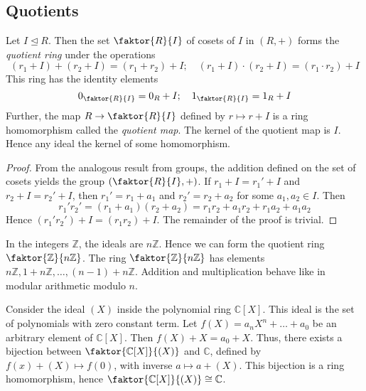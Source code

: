 \subsection{Quotients}
\begin{theorem}
	Let \( I \trianglelefteq R \).
	Then the set \( \faktor{R}{I} \) of cosets of \( I \) in \( (R, +) \) forms the \textit{quotient ring} under the operations
	\[ (r_1 + I) + (r_2 + I) = (r_1 + r_2) + I;\quad (r_1 + I) \cdot (r_2 + I) = (r_1 \cdot r_2) + I \]
	This ring has the identity elements
	\[ 0_{\faktor{R}{I}} = 0_R + I;\quad 1_{\faktor{R}{I}} = 1_R + I \]
	Further, the map \( R \to \faktor{R}{I} \) defined by \( r \mapsto r + I \) is a ring homomorphism called the \textit{quotient map}.
	The kernel of the quotient map is \( I \).
	Hence any ideal the kernel of some homomorphism.
\end{theorem}
\begin{proof}
	From the analogous result from groups, the addition defined on the set of cosets yields the group \( \qty(\faktor{R}{I}, +) \).
	If \( r_1 + I = r_1' + I \) and \( r_2 + I = r_2' + I \), then \( r_1' = r_1 + a_1 \) and \( r_2' = r_2 + a_2 \) for some \( a_1, a_2 \in I \).
	Then
	\[ r_1' r_2' = (r_1 + a_1)(r_2 + a_2) = r_1 r_2 + a_1 r_2 + r_1 a_2 + a_1 a_2 \]
	Hence \( (r_1' r_2') + I = (r_1 r_2) + I \).
	The remainder of the proof is trivial.
\end{proof}
\begin{example}
	In the integers \( \mathbb Z \), the ideals are \( n\mathbb Z \).
	Hence we can form the quotient ring \( \faktor{\mathbb Z}{n\mathbb Z} \).
	The ring \( \faktor{\mathbb Z}{n\mathbb Z} \) has elements \( n\mathbb Z, 1 + n\mathbb Z, \dots, (n-1) + n\mathbb Z \).
	Addition and multiplication behave like in modular arithmetic modulo \( n \).
\end{example}
\begin{example}
	Consider the ideal \( (X) \) inside the polynomial ring \( \mathbb C[X] \).
	This ideal is the set of polynomials with zero constant term.
	Let \( f(X) = a_n X^n + \dots + a_0 \) be an arbitrary element of \( \mathbb C[X] \).
	Then \( f(X) + X = a_0 + X \).
	Thus, there exists a bijection between \( \faktor{\mathbb C[X]}{(X)} \) and \( \mathbb C \), defined by \( f(x) + (X) \mapsto f(0) \), with inverse \( a \mapsto a + (X) \).
	This bijection is a ring homomorphism, hence \( \faktor{\mathbb C[X]}{(X)} \cong \mathbb C \).
\end{example}
